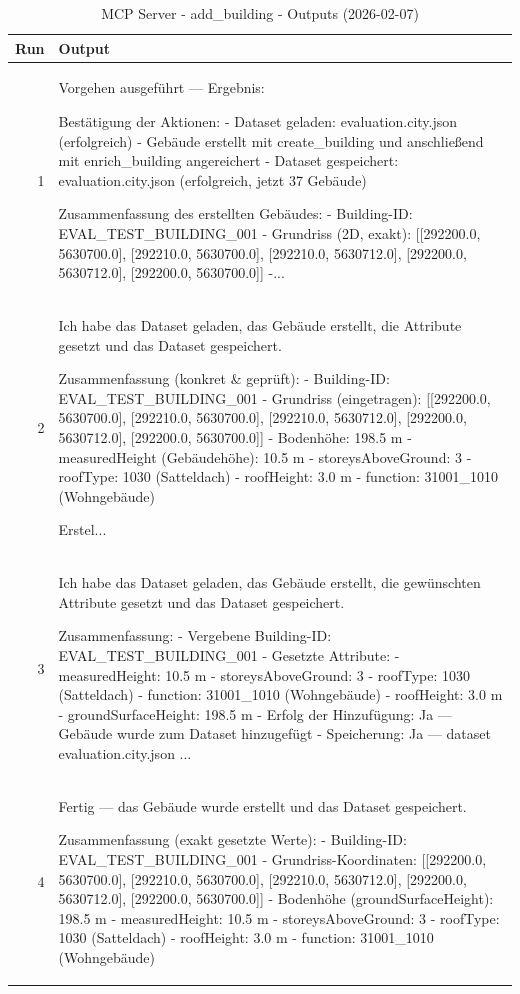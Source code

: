 \documentclass[a4paper,11pt]{article}
\begin{document}
\begin{table}[ht]
\centering
\scriptsize
\caption{MCP Server - add\_building - Outputs (2026-02-07)}
\label{tab:mcp\_add\_building\_outputs\_2026-02-07}
\begin{tabular}{r p{12cm}}
\hline
Run & Output \\
\hline
1 & Vorgehen ausgeführt — Ergebnis:

Bestätigung der Aktionen:
- Dataset geladen: evaluation.city.json (erfolgreich)
- Gebäude erstellt mit create\_building und anschließend mit enrich\_building angereichert
- Dataset gespeichert: evaluation.city.json (erfolgreich, jetzt 37 Gebäude)

Zusammenfassung des erstellten Gebäudes:
- Building-ID: EVAL\_TEST\_BUILDING\_001
- Grundriss (2D, exakt): [[292200.0, 5630700.0], [292210.0, 5630700.0], [292210.0, 5630712.0], [292200.0, 5630712.0], [292200.0, 5630700.0]]
-... \\
2 & Ich habe das Dataset geladen, das Gebäude erstellt, die Attribute gesetzt und das Dataset gespeichert.

Zusammenfassung (konkret \& geprüft):
- Building-ID: EVAL\_TEST\_BUILDING\_001
- Grundriss (eingetragen): [[292200.0, 5630700.0], [292210.0, 5630700.0], [292210.0, 5630712.0], [292200.0, 5630712.0], [292200.0, 5630700.0]]
- Bodenhöhe: 198.5 m
- measuredHeight (Gebäudehöhe): 10.5 m
- storeysAboveGround: 3
- roofType: 1030 (Satteldach)
- roofHeight: 3.0 m
- function: 31001\_1010 (Wohngebäude)

Erstel... \\
3 & Ich habe das Dataset geladen, das Gebäude erstellt, die gewünschten Attribute gesetzt und das Dataset gespeichert.

Zusammenfassung:
- Vergebene Building-ID: EVAL\_TEST\_BUILDING\_001
- Gesetzte Attribute:
  - measuredHeight: 10.5 m
  - storeysAboveGround: 3
  - roofType: 1030 (Satteldach)
  - function: 31001\_1010 (Wohngebäude)
  - roofHeight: 3.0 m
  - groundSurfaceHeight: 198.5 m
- Erfolg der Hinzufügung: Ja — Gebäude wurde zum Dataset hinzugefügt
- Speicherung: Ja — dataset evaluation.city.json ... \\
4 & Fertig — das Gebäude wurde erstellt und das Dataset gespeichert.

Zusammenfassung (exakt gesetzte Werte):
- Building-ID: EVAL\_TEST\_BUILDING\_001
- Grundriss-Koordinaten: [[292200.0, 5630700.0], [292210.0, 5630700.0], [292210.0, 5630712.0], [292200.0, 5630712.0], [292200.0, 5630700.0]]
- Bodenhöhe (groundSurfaceHeight): 198.5 m
- measuredHeight: 10.5 m
- storeysAboveGround: 3
- roofType: 1030 (Satteldach)
- roofHeight: 3.0 m
- function: 31001\_1010 (Wohngebäude)


\end{tabular}
\end{table}
\end{document}
